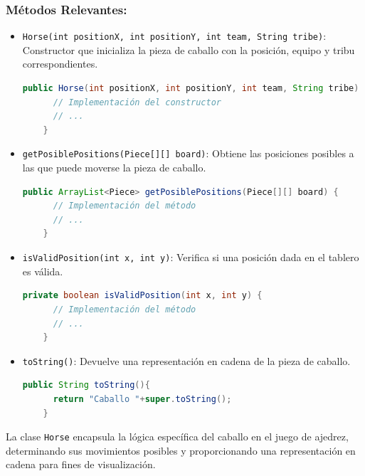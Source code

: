 \documentclass{article}
\begin{document}
\subsubsection{Métodos Relevantes:}
\begin{itemize}
  \item \texttt{Horse(int positionX, int positionY, int team, String tribe)}: Constructor que inicializa la pieza de caballo con la posición, equipo y tribu correspondientes.
  \begin{lstlisting}[language=java,caption={Constructor \texttt{Horse} en la clase \texttt{Horse}}]
    public Horse(int positionX, int positionY, int team, String tribe) {
      // Implementación del constructor
      // ...
    }
  \end{lstlisting}

  \item \texttt{getPosiblePositions(Piece[][] board)}: Obtiene las posiciones posibles a las que puede moverse la pieza de caballo.
  \begin{lstlisting}[language=java,caption={Método \texttt{getPosiblePositions} en la clase \texttt{Horse}}]
    public ArrayList<Piece> getPosiblePositions(Piece[][] board) {
      // Implementación del método
      // ...
    }
  \end{lstlisting}

  \item \texttt{isValidPosition(int x, int y)}: Verifica si una posición dada en el tablero es válida.
  \begin{lstlisting}[language=java,caption={Método \texttt{isValidPosition} en la clase \texttt{Horse}}]
    private boolean isValidPosition(int x, int y) {
      // Implementación del método
      // ...
    }
  \end{lstlisting}

  \item \texttt{toString()}: Devuelve una representación en cadena de la pieza de caballo.
  \begin{lstlisting}[language=java,caption={Método \texttt{toString} en la clase \texttt{Horse}}]
    public String toString(){
      return "Caballo "+super.toString();
    }
  \end{lstlisting}
\end{itemize}

La clase \texttt{Horse} encapsula la lógica específica del caballo en el juego de ajedrez, determinando sus movimientos posibles y proporcionando una representación en cadena para fines de visualización.
\end{document}
